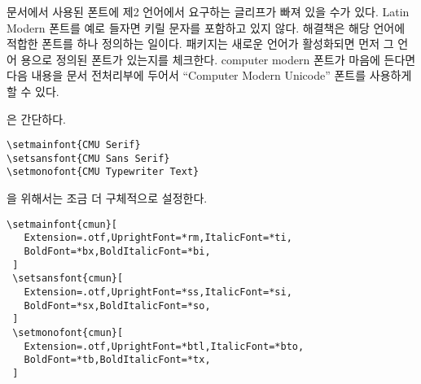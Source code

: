 문서에서 사용된 폰트에 제2 언어에서 요구하는 글리프가 빠져 있을 수가 있다.
Latin Modern 폰트를 예로 들자면 키릴 문자를 포함하고 있지 않다.
해결책은 해당 언어에 적합한 폰트를 하나 정의하는 일이다. 
 패키지는 새로운 언어가 활성화되면 먼저 그 언어 용으로 정의된 폰트가 있는지를 체크한다.
computer modern 폰트가 마음에 든다면 다음 내용을 문서 전처리부에 두어서 \enquote{Computer Modern Unicode} 폰트를 사용하게 할 수 있다.

\medskip\noindent {}은 간단하다.
\begin{verbatim}
\setmainfont{CMU Serif}
\setsansfont{CMU Sans Serif}
\setmonofont{CMU Typewriter Text}
\end{verbatim}
\noindent {}을 위해서는 조금 더 구체적으로 설정한다.
\begin{verbatim}
\setmainfont{cmun}[
   Extension=.otf,UprightFont=*rm,ItalicFont=*ti,
   BoldFont=*bx,BoldItalicFont=*bi,
 ]
 \setsansfont{cmun}[
   Extension=.otf,UprightFont=*ss,ItalicFont=*si,
   BoldFont=*sx,BoldItalicFont=*so,
 ]
 \setmonofont{cmun}[
   Extension=.otf,UprightFont=*btl,ItalicFont=*bto,
   BoldFont=*tb,BoldItalicFont=*tx,
 ]
\end{verbatim}

